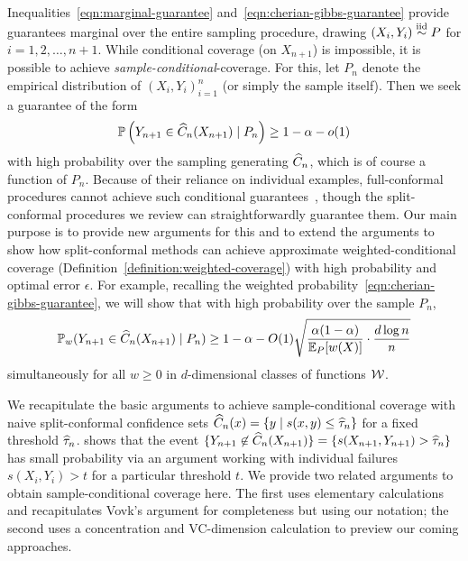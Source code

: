 \documentclass[11pt]{article}
\newcommand{\scorefunc}{s}
\newcommand{\scoreval}{\scorefunc}
\newcommand{\scorerv}{S}
\begin{document}
Inequalities~\eqref{eqn:marginal-guarantee}
and~\eqref{eqn:cherian-gibbs-guarantee} provide
guarantees marginal over the entire sampling
procedure, drawing $(X_i, Y_i) \stackrel{\rm iid}{\sim} P$ for $i = 1, 2, \ldots, n + 1$.
%
While conditional coverage (on $X_{n + 1}$) is
impossible, it is possible to achieve
\emph{sample-conditional}-coverage.
%
For this, let $P_n$ denote the empirical distribution of $(X_i, Y_i)_{i =
  1}^n$ (or simply the sample itself).
%
Then we seek a guarantee of the form
\begin{equation*}
  \mathbb{P}\left(Y_{n + 1} \in \widehat{C}_n(X_{n + 1}) \mid P_n\right)
  \ge 1 - \alpha - o(1)
\end{equation*}
with high probability over the sampling generating $\widehat{C}_n$, which is of
course a function of $P_n$.
%
Because of their reliance on individual examples, full-conformal procedures
cannot achieve such conditional guarantees~\cite{BianBa22}, though the
split-conformal procedures we review can straightforwardly guarantee them.
%
Our main purpose is to provide new arguments for this and
to extend the arguments to show how split-conformal methods can achieve
approximate weighted-conditional coverage
(Definition~\ref{definition:weighted-coverage}) with high probability
and optimal error $\epsilon$.
%
For example, recalling the weighted
probability~\eqref{eqn:cherian-gibbs-guarantee}, we will show that with high
probability over the sample $P_n$,
\begin{equation*}
  \mathbb{P}_w(Y_{n + 1} \in \widehat{C}_n(X_{n + 1}) \mid P_n) \ge
  1 - \alpha - O(1) \sqrt{\frac{\alpha(1 - \alpha)}{\mathbb{E}_P[w(X)]}
    \cdot \frac{d \log n}{n}}
\end{equation*}
simultaneously for all $w \ge 0$ in $d$-dimensional classes of functions
$\mathcal{W}$.

We recapitulate the basic arguments to achieve sample-conditional coverage
with naive split-conformal confidence sets $\what{C}_n(x) =
\{y \mid \scorefunc(x, y) \le \what{\tau}_n\}$ for a fixed threshold
$\widehat{\tau}_n$.
%
%
\citet[Section 3]{Vovk12} shows that the
event $\{Y_{n + 1} \not \in \what{C}_n(X_{n + 1})\}
= \{\scorefunc(X_{n + 1}, Y_{n + 1}) > \what{\tau}_n\}$
has small probability via an
argument working with individual failures $\scoreval(X_i, Y_i) > t$
for a particular threshold $t$.
%
We provide two related arguments to obtain sample-conditional coverage here.
%
The first uses elementary calculations and recapitulates Vovk's
argument for completeness but using our notation; the second uses a
concentration and VC-dimension calculation to preview our coming approaches.
\end{document}
